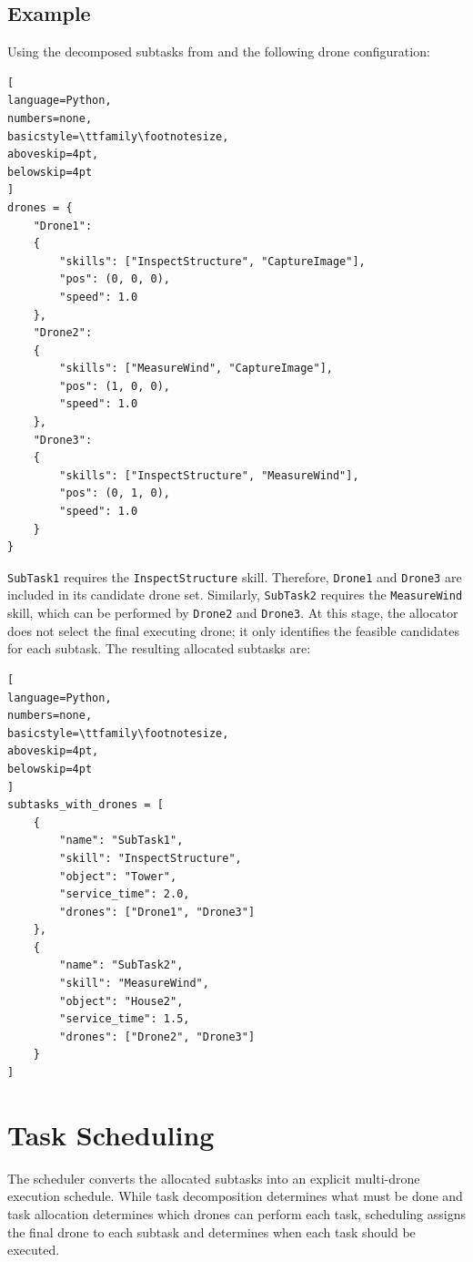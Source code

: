 \subsection{Example}
Using the decomposed subtasks from  and the following drone configuration:

\noindent\begin{minipage}{\linewidth}
\begin{lstlisting}[
language=Python,
numbers=none,
basicstyle=\ttfamily\footnotesize,
aboveskip=4pt,
belowskip=4pt
]
drones = {
    "Drone1":
    {
        "skills": ["InspectStructure", "CaptureImage"],
        "pos": (0, 0, 0),
        "speed": 1.0
    },
    "Drone2":
    {
        "skills": ["MeasureWind", "CaptureImage"],
        "pos": (1, 0, 0),
        "speed": 1.0
    },
    "Drone3":
    {
        "skills": ["InspectStructure", "MeasureWind"],
        "pos": (0, 1, 0),
        "speed": 1.0
    }
}
\end{lstlisting}
\end{minipage}

\texttt{SubTask1} requires the \texttt{InspectStructure} skill. 
Therefore, \texttt{Drone1} and \texttt{Drone3} are included in its candidate drone set. 
Similarly, \texttt{SubTask2} requires the \texttt{MeasureWind} skill, which can be performed by \texttt{Drone2} and \texttt{Drone3}. 
At this stage, the allocator does not select the final executing drone; it only identifies the feasible candidates for each subtask.
The resulting allocated subtasks are:

\noindent\begin{minipage}{\linewidth}
\begin{lstlisting}[
language=Python,
numbers=none,
basicstyle=\ttfamily\footnotesize,
aboveskip=4pt,
belowskip=4pt
]
subtasks_with_drones = [
    {
        "name": "SubTask1",
        "skill": "InspectStructure",
        "object": "Tower",
        "service_time": 2.0,
        "drones": ["Drone1", "Drone3"]
    },
    {
        "name": "SubTask2",
        "skill": "MeasureWind",
        "object": "House2",
        "service_time": 1.5,
        "drones": ["Drone2", "Drone3"]
    }
]
\end{lstlisting}
\end{minipage}

\section{Task Scheduling}
The scheduler converts the allocated subtasks into an explicit multi-drone execution schedule.
While task decomposition determines what must be done and task allocation determines which drones can perform each task, 
scheduling assigns the final drone to each subtask and determines when each task should be executed.


